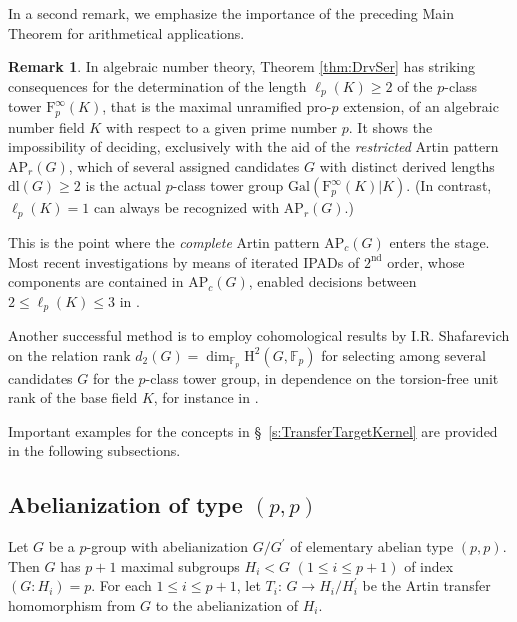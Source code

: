 \documentclass{amsart}
\theoremstyle{definition}
\newtheorem{remark}{Remark}[section]
\numberwithin{equation}{section}
\begin{document}
\noindent
In a second remark, we emphasize the importance of the preceding Main Theorem
for arithmetical applications.

\begin{remark}
\label{rmk:ClsTwr}
In algebraic number theory, Theorem
\ref{thm:DrvSer}
has striking consequences for the determination of
the length \(\ell_p(K)\ge 2\) of the \(p\)-class tower \(\mathrm{F}_p^\infty(K)\),
that is the maximal unramified pro-\(p\) extension,
of an algebraic number field \(K\)
with respect to a given prime number \(p\).
It shows the impossibility of deciding,
exclusively with the aid of the \textit{restricted} Artin pattern \(\mathrm{AP}_r(G)\),
which of several assigned candidates \(G\) with distinct derived lengths \(\mathrm{dl}(G)\ge 2\)
is the actual \(p\)-class tower group \(\mathrm{Gal}(\mathrm{F}_p^\infty(K)\vert K)\).
(In contrast, \(\ell_p(K)=1\) can always be recognized with \(\mathrm{AP}_r(G)\).)

This is the point where the \textit{complete} Artin pattern \(\mathrm{AP}_c(G)\) enters the stage.
Most recent investigations by means of iterated IPADs of \(2^{\mathrm{nd}}\) order,
whose components are contained in \(\mathrm{AP}_c(G)\),
enabled decisions between \(2\le\ell_p(K)\le 3\) in
\cite{Ma6,Ma8}.

Another successful method is to employ cohomological results by I.R. Shafarevich
on the relation rank \(d_2(G)=\dim_{\mathbb{F}_p}\mathrm{H}^2(G,\mathbb{F}_p)\)
for selecting among several candidates \(G\) for the \(p\)-class tower group,
in dependence on the torsion-free unit rank of the base field \(K\),
for instance in
\cite{BuMa,Ma7}.
\end{remark}

\noindent
Important examples for the concepts in \S\
\ref{s:TransferTargetKernel}
are provided in the following subsections.



\subsection{Abelianization of type \((p,p)\)}
\label{ss:DrvQtnTypePePe}

Let \(G\) be a \(p\)-group with abelianization \(G/G^\prime\) of elementary abelian type \((p,p)\).
Then \(G\) has \(p+1\) maximal subgroups \(H_i<G\) \((1\le i\le p+1)\) of index \((G:H_i)=p\).
For each \(1\le i\le p+1\), let \(T_i:\,G\to H_i/H_i^\prime\) be
the Artin transfer homomorphism from \(G\) to the abelianization of \(H_i\).
\end{document}
